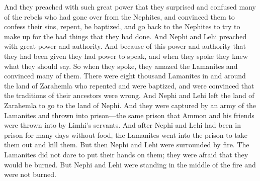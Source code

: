 And they preached with such great power that they surprised and confused many of the rebels who had gone over from the Nephites, and convinced them to confess their sins, repent, be baptized, and go back to the Nephites to try to make up for the bad things that they had done.
\bverse \iffalse And it came to pass that Nephi and Lehi did preach unto the Lamanites with such great power and authority, for they had power and authority, given unto them that they might speak, and they also had what they should speak given unto them-- \fi
And Nephi and Lehi preached with great power and authority. And because of this power and authority that they had been given they had power to speak, and when they spoke they knew what they should say.
\bverse \iffalse Therefore they did speak unto the great astonishment of the Lamanites, to the convincing them, insomuch that there were eight thousand of the Lamanites who were in the land of Zarahemla and round about baptized unto repentance, and were convinced of the wickedness of the traditions of their fathers. \fi
So when they spoke, they amazed the Lamanites and convinced many of them. There were eight thousand Lamanites in and around the land of Zarahemla who repented and were baptized, and were convinced that the traditions of their ancestors were wrong.
\bverse \iffalse And it came to pass that Nephi and Lehi did proceed from thence to go to the land of Nephi. \fi
And Nephi and Lehi left the land of Zarahemla to go to the land of Nephi.
\bverse \iffalse And it came to pass that they were taken by an army of the Lamanites and cast into prison; yea, even in that same prison in which Ammon and his brethren were cast by the servants of Limhi. \fi
And they were captured by an army of the Lamanites and thrown into prison---the same prison that Ammon and his friends were thrown into by Limhi's servants.
\bverse \iffalse And after they had been cast into prison many days without food, behold, they went forth into the prison to take them that they might slay them. \fi
And after Nephi and Lehi had been in prison for many days without food, the Lamanites went into the prison to take them out and kill them.
\bverse \iffalse And it came to pass that Nephi and Lehi were encircled about as if by fire, even insomuch that they durst not lay their hands upon them for fear lest they should be burned. Nevertheless, Nephi and Lehi were not burned; and they were as standing in the midst of fire and were not burned. \fi
But then Nephi and Lehi were surrounded by fire. The Lamanites did not dare to put their hands on them; they were afraid that they would be burned. But Nephi and Lehi were standing in the middle of the fire and were not burned.

